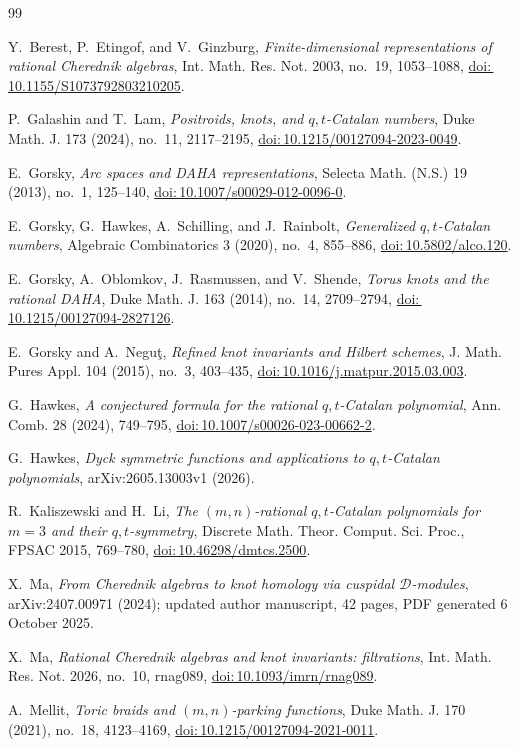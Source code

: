 \documentclass[11pt]{article}
\newcommand{\doi}[1]{\href{https://doi.org/#1}{doi:\,#1}}
\begin{document}
\begin{thebibliography}{99}

Y.~Berest, P.~Etingof, and V.~Ginzburg,
\emph{Finite-dimensional representations of rational Cherednik algebras},
Int. Math. Res. Not. 2003, no.~19, 1053--1088,
\doi{10.1155/S1073792803210205}.

P.~Galashin and T.~Lam,
\emph{Positroids, knots, and $q,t$-Catalan numbers},
Duke Math. J. 173 (2024), no.~11, 2117--2195,
\doi{10.1215/00127094-2023-0049}.

E.~Gorsky,
\emph{Arc spaces and DAHA representations},
Selecta Math. (N.S.) 19 (2013), no.~1, 125--140,
\doi{10.1007/s00029-012-0096-0}.

E.~Gorsky, G.~Hawkes, A.~Schilling, and J.~Rainbolt,
\emph{Generalized $q,t$-Catalan numbers},
Algebraic Combinatorics 3 (2020), no.~4, 855--886,
\doi{10.5802/alco.120}.

E.~Gorsky, A.~Oblomkov, J.~Rasmussen, and V.~Shende,
\emph{Torus knots and the rational DAHA},
Duke Math. J. 163 (2014), no.~14, 2709--2794,
\doi{10.1215/00127094-2827126}.

E.~Gorsky and A.~Negu\c{t},
\emph{Refined knot invariants and Hilbert schemes},
J. Math. Pures Appl. 104 (2015), no.~3, 403--435,
\doi{10.1016/j.matpur.2015.03.003}.

G.~Hawkes,
\emph{A conjectured formula for the rational $q,t$-Catalan polynomial},
Ann. Comb. 28 (2024), 749--795,
\doi{10.1007/s00026-023-00662-2}.

G.~Hawkes,
\emph{Dyck symmetric functions and applications to $q,t$-Catalan polynomials},
arXiv:2605.13003v1 (2026).

R.~Kaliszewski and H.~Li,
\emph{The $(m,n)$-rational $q,t$-Catalan polynomials for $m=3$ and their
$q,t$-symmetry},
Discrete Math. Theor. Comput. Sci. Proc., FPSAC 2015, 769--780,
\doi{10.46298/dmtcs.2500}.

X.~Ma,
\emph{From Cherednik algebras to knot homology via cuspidal
$\mathcal D$-modules},
arXiv:2407.00971 (2024); updated author manuscript, 42 pages,
PDF generated 6 October 2025.

X.~Ma,
\emph{Rational Cherednik algebras and knot invariants: filtrations},
Int. Math. Res. Not. 2026, no.~10, rnag089,
\doi{10.1093/imrn/rnag089}.

A.~Mellit,
\emph{Toric braids and $(m,n)$-parking functions},
Duke Math. J. 170 (2021), no.~18, 4123--4169,
\doi{10.1215/00127094-2021-0011}.

\end{thebibliography}
\end{document}
